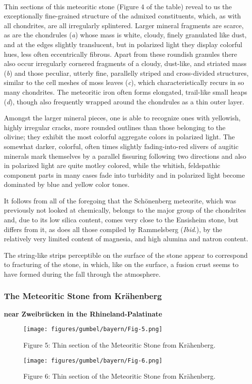 \documentclass[a4paper, 12pt, oneside]{article}
\begin{document}
\paragraph*{}
Thin sections of this meteoritic stone (Figure 4 of the table) reveal to us the exceptionally fine-grained structure of the admixed constituents, which, as with all chondrites, are all irregularly splintered. Larger mineral fragments are scarce, as are the chondrules (\emph{a}) whose mass is white, cloudy, finely granulated like dust, and at the edges slightly translucent, but in polarized light they display colorful hues, less often eccentrically fibrous. Apart from these roundish granules there also occur irregularly cornered fragments of a cloudy, dust-like, and striated mass (\emph{b}) and those peculiar, utterly fine, parallelly striped and cross-divided structures, similar to the cell meshes of moss leaves (\emph{c}), which characteristically recurs in so many chondrites. The meteoritic iron often forms elongated, trail-like small heaps (\emph{d}), though also frequently wrapped around the chondrules as a thin outer layer.

Amongst the larger mineral pieces, one is able to recognize ones with yellowish, highly irregular cracks, more rounded outlines than those belonging to the olivine; they exhibit the most colorful aggregate colors in polarized light. The somewhat darker, colorful, often times slightly fading-into-red slivers of augitic minerals mark themselves by a parallel fissuring following two directions and also in polarized light are quite motley colored, while the whitish, feldspathic component parts in many cases fade into turbidity and in polarized light become dominated by blue and yellow color tones.

It follows from all of the foregoing that the Schönenberg meteorite, which was previously not looked at chemically, belongs to the major group of the chondrites and, due to its low silica content, comes very close to the Ensisheim stone, but differs from it, as does all those compiled by Rammelsberg (\emph{Ibid}.), by the relatively very limited content of magnesia, and high alumina and natron content.

The string-like strips perceptible on the surface of the stone appear to correspond to fracturing of the stone, in which, like on the surface, a fusion crust seems to have formed during the fall through the atmosphere.
\clearpage

\subsubsection{The Meteoritic Stone from Krähenberg}
\textbf{near Zweibrücken in the Rhineland-Palatinate}
\begin{figure}[h]
\centering
\texttt{[image: figures/gumbel/bayern/Fig-5.png]}
\caption{Figure 5: Thin section of the Meteoritic Stone from Krähenberg.}
\end{figure}
\begin{figure}[h]
\centering
\texttt{[image: figures/gumbel/bayern/Fig-6.png]}
\caption{Figure 6: Thin section of the Meteoritic Stone from Krähenberg.}
\end{figure}
\end{document}
